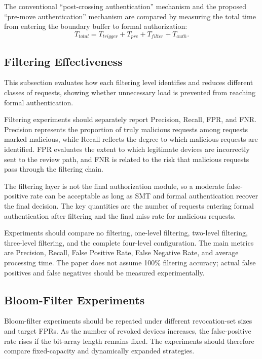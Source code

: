 \documentclass[lettersize,journal]{IEEEtran}
\begin{document}
	The conventional ``post-crossing authentication'' mechanism and the proposed ``pre-move authentication'' mechanism are compared by measuring the total time from entering the boundary buffer to formal authorization:
	\begin{equation}
		T_{total}=T_{trigger}+T_{pre}+T_{filter}+T_{auth}.
	\end{equation}
	
	\subsection{Filtering Effectiveness}
	This subsection evaluates how each filtering level identifies and reduces different classes of requests, showing whether unnecessary load is prevented from reaching formal authentication.
	
	
	Filtering experiments should separately report Precision, Recall, FPR, and FNR. Precision represents the proportion of truly malicious requests among requests marked malicious, while Recall reflects the degree to which malicious requests are identified. FPR evaluates the extent to which legitimate devices are incorrectly sent to the review path, and FNR is related to the risk that malicious requests pass through the filtering chain.
	
	The filtering layer is not the final authorization module, so a moderate false-positive rate can be acceptable as long as SMT and formal authentication recover the final decision. The key quantities are the number of requests entering formal authentication after filtering and the final miss rate for malicious requests.
	
	Experiments should compare no filtering, one-level filtering, two-level filtering, three-level filtering, and the complete four-level configuration. The main metrics are Precision, Recall, False Positive Rate, False Negative Rate, and average processing time. The paper does not assume 100\% filtering accuracy; actual false positives and false negatives should be measured experimentally.
	
	\subsection{Bloom-Filter Experiments}
	
	Bloom-filter experiments should be repeated under different revocation-set sizes and target FPRs. As the number of revoked devices increases, the false-positive rate rises if the bit-array length remains fixed. The experiments should therefore compare fixed-capacity and dynamically expanded strategies.
	
\end{document}

